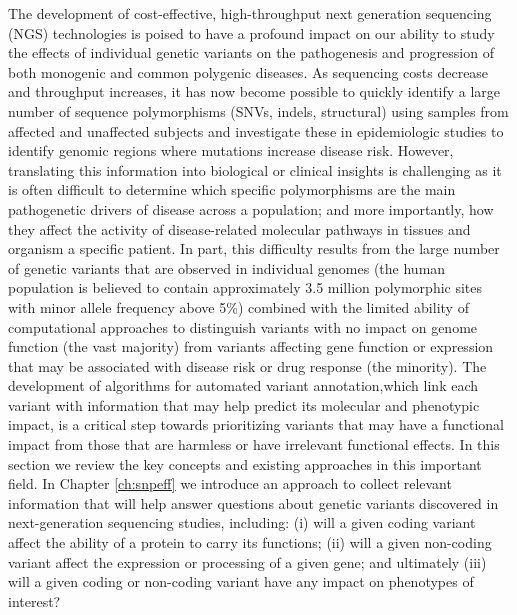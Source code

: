 The development of cost-effective, high-throughput next generation sequencing (NGS) technologies is poised to have a profound impact on our ability to study the effects of individual genetic variants on the pathogenesis and progression of both monogenic and common polygenic diseases. As sequencing costs decrease and throughput increases, it has now become possible to quickly identify a large number of sequence polymorphisms (SNVs, indels, structural) using samples from affected and unaffected subjects and investigate these in epidemiologic studies to identify genomic regions where mutations increase disease risk. However, translating this information into biological or clinical insights is challenging as it is often difficult to determine which specific polymorphisms are the main pathogenetic drivers of disease across a population; and more importantly, how they affect the activity of disease-related molecular pathways in tissues and organism a specific patient. In part, this difficulty results from the large number of genetic variants that are observed in individual genomes (the human population is believed to contain approximately 3.5 million polymorphic sites with minor allele frequency above 5\%) combined with the limited ability of computational approaches to distinguish variants with no impact on genome function (the vast majority) from variants affecting gene function or expression that may be associated with disease risk or drug response (the minority). The development of algorithms for automated variant annotation,which link each variant with information that may help predict its molecular and phenotypic impact, is a critical step towards prioritizing variants that may have a functional impact from those that are harmless or have irrelevant functional effects. In this section we review the key concepts and existing approaches in this important field. In Chapter \ref{ch:snpeff} we introduce an approach to collect relevant information that will help answer questions about genetic variants discovered in next-generation sequencing studies, including: (i) will a given coding variant affect the ability of a protein to carry its functions; (ii) will a given non-coding variant affect the expression or processing of a given gene; and ultimately (iii) will a given coding or non-coding variant have any impact on phenotypes of interest?

